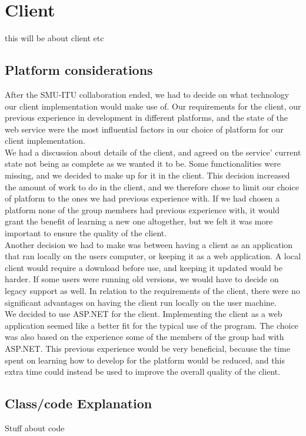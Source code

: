 \documentclass[10pt,a4paper]{article}
\begin{document}
\newpage

\section{Client}
this will be about client etc
\subsection{Platform considerations}
After the SMU-ITU collaboration ended, we had to decide on what technology our client implementation would make use of. Our requirements for the client, our previous experience in development in different platforms, and the state of the web service were the most influential factors in our choice of platform for our client implementation.\\
We had a discussion about details of the client, and agreed on the service’ current state not being as complete as we wanted it to be. Some functionalities were missing, and we decided to make up for it in the client. This decision increased the amount of work to do in the client, and we therefore chose to limit our choice of platform to the ones we had previous experience with. If we had chosen a platform none of the group members had previous experience with, it would grant the benefit of learning a new one altogether, but we felt it was more important to ensure the quality of the client.\\
Another decision we had to make was between having a client as an application that ran locally on the users computer, or keeping it as a web application. A local client would require a download before use, and keeping it updated would be harder. If some users were running old versions, we would have to decide on legacy support as well. In relation to the requirements of the client, there were no significant advantages on having the client run locally on the user machine.\\
We decided to use ASP.NET for the client. Implementing the client as a web application seemed like a better fit for the typical use of the program. The choice was also based on the experience some of the members of the group had with ASP.NET. This previous experience would be very beneficial, because the time spent on learning how to develop for the platform would be reduced, and this extra time could instead be used to improve the overall quality of the client.

\subsection{Class/code Explanation}
Stuff about code
\end{document}
